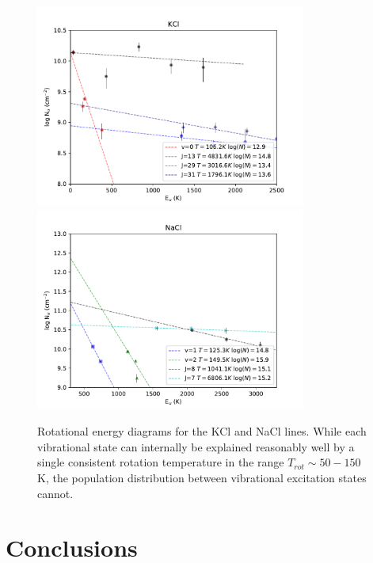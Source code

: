 \documentclass[twocolumn]{aastex62}
\begin{document}
\begin{figure}[!htp]
\includegraphics[scale=1,width=3.5in]{figures/KCl_rotational_diagrams.pdf}
\includegraphics[scale=1,width=3.5in]{figures/NaCl_rotational_diagrams.pdf}
\caption{Rotational energy diagrams for the KCl and NaCl lines.  While each
vibrational state can internally be explained reasonably well by a single
consistent rotation temperature in the range $T_{rot}\sim50-150$ K, the population
distribution between vibrational excitation states cannot.}
\label{fig:rotationdiagrams}
\end{figure}









\section{Conclusions}

\end{document}
